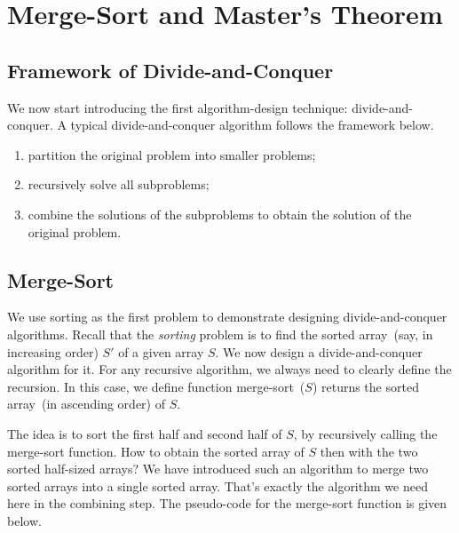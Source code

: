 \setcounter{definition}{0} \setcounter{property}{0} \setcounter{claim}{0} \setcounter{fact}{0} \setcounter{corollary}{0} \setcounter{figure}{0}
\section{Merge-Sort and Master's Theorem}

\subsection*{Framework of Divide-and-Conquer}

We now start introducing the first algorithm-design technique:
divide-and-conquer. 
A typical divide-and-conquer algorithm follows the framework below.
\begin{enumerate}
\item partition the original problem into smaller problems;
\item recursively solve all subproblems;
\item combine the solutions of the subproblems to obtain the solution of the original problem.
\end{enumerate}

\subsection*{Merge-Sort}

We use sorting as the first problem
to demonstrate designing divide-and-conquer algorithms.
Recall that the \emph{sorting} problem is to find the sorted array~(say, in increasing order) $S'$ of a given array $S$.  
We now design a divide-and-conquer algorithm for it. For any recursive algorithm, we always need to
clearly define the recursion. In this case, we define function merge-sort~($S$) returns the
sorted array~(in ascending order) of $S$.

The idea is to sort the first half and second half of $S$, by recursively calling the merge-sort function.
How to obtain the sorted array of $S$ then with the two sorted half-sized arrays?
We have introduced such an algorithm to merge two sorted arrays into a single sorted array.
That's exactly the algorithm we need here in the combining step.
The pseudo-code for the merge-sort function is given below.

\begin{algorithmblock}[0.8\textwidth]
	\xxx
	\xxx
	\xxx
	\xxx
	\xxx
\end{algorithmblock}

